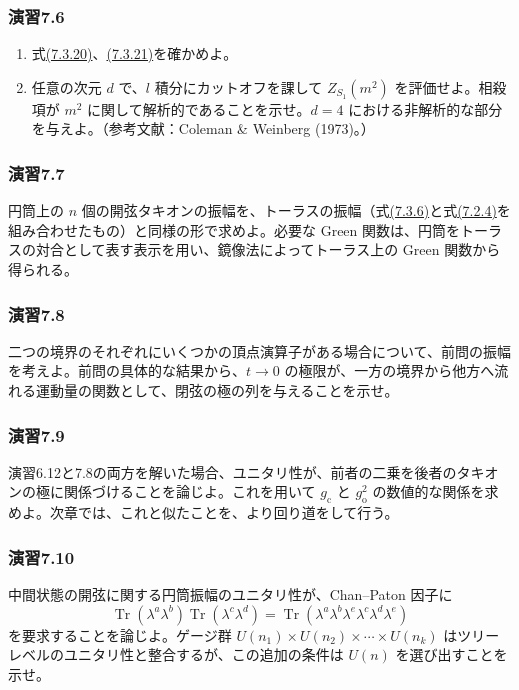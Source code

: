 \subsubsection*{演習7.6}\label{ex:7.6}
\begin{enumerate}
\item[(a)] 式\hyperref[eq:7.3.20]{(7.3.20)}、\hyperref[eq:7.3.21]{(7.3.21)}を確かめよ。
\item[(b)] 任意の次元 $d$ で、$l$ 積分にカットオフを課して $Z_{S_1}(m^2)$ を評価せよ。相殺項が $m^2$ に関して解析的であることを示せ。$d=4$ における非解析的な部分を与えよ。（参考文献：Coleman \& Weinberg (1973)。）
\end{enumerate}

\subsubsection*{演習7.7}\label{ex:7.7}
円筒上の $n$ 個の開弦タキオンの振幅を、トーラスの振幅（式\hyperref[eq:7.3.6]{(7.3.6)}と式\hyperref[eq:7.2.4]{(7.2.4)}を組み合わせたもの）と同様の形で求めよ。必要な Green 関数は、円筒をトーラスの対合として表す表示を用い、鏡像法によってトーラス上の Green 関数から得られる。

\subsubsection*{演習7.8}\label{ex:7.8}
二つの境界のそれぞれにいくつかの頂点演算子がある場合について、前問の振幅を考えよ。前問の具体的な結果から、$t\to0$ の極限が、一方の境界から他方へ流れる運動量の関数として、閉弦の極の列を与えることを示せ。

\subsubsection*{演習7.9}\label{ex:7.9}
演習6.12と7.8の両方を解いた場合、ユニタリ性が、前者の二乗を後者のタキオンの極に関係づけることを論じよ。これを用いて $g_{\mathrm c}$ と $g_{\mathrm o}^2$ の数値的な関係を求めよ。次章では、これと似たことを、より回り道をして行う。

\subsubsection*{演習7.10}\label{ex:7.10}
中間状態の開弦に関する円筒振幅のユニタリ性が、Chan--Paton 因子に
\[
\operatorname{Tr}(\lambda^a\lambda^b)\operatorname{Tr}(\lambda^c\lambda^d)
=\operatorname{Tr}(\lambda^a\lambda^b\lambda^e\lambda^c\lambda^d\lambda^e)
\]
を要求することを論じよ。ゲージ群 $U(n_1)\times U(n_2)\times\cdots\times U(n_k)$ はツリーレベルのユニタリ性と整合するが、この追加の条件は $U(n)$ を選び出すことを示せ。

